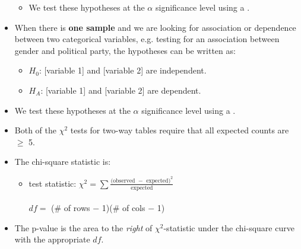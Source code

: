 \begin{itemize}
\begin{itemize}
\item[] We test these hypotheses at the $\alpha$ significance level using a .
\end{itemize}
\item When there is \textbf{one sample} and we are looking for association or dependence between two categorical variables, e.g. testing for an association between gender and political party, the hypotheses can be written as:
\begin{itemize}
\item[] $H_0$:  [variable 1] and [variable 2] are independent.   
\item[]  $H_A$:  [variable 1] and [variable 2] are dependent.
\end{itemize}
\item[] We test these hypotheses at the $\alpha$ significance level using a .
\item Both of the $\chi^2$ tests for two-way tables require that all expected counts are $\ge$ 5.  
\item The chi-square statistic is:
\begin{itemize}
\item[] test statistic:  $\chi^2 =\sum{ \frac{\text{(observed } - \text{ expected})^2}{\text{expected}}}$\\
\\$df =$ (\# of rows $-$ 1)(\# of cols $-$ 1)
\end{itemize}
\item The p-value is the area to the \emph{right} of $\chi^2$-statistic under the chi-square curve with the appropriate $df$.
\end{itemize}


{}


\reviewchapterheader{}

